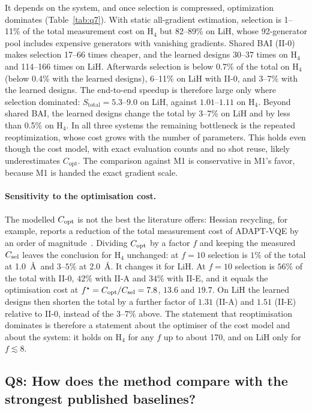 \documentclass[aps,pra,reprint,superscriptaddress,nofootinbib]{revtex4-2}
\begin{document}
It depends on the system, and once selection is compressed, optimization dominates (Table~\ref{tab:q7}). With static all-gradient estimation, selection is 1--11\% of the total measurement cost on H$_4$ but 82--89\% on LiH, whose 92-generator pool includes expensive generators with vanishing gradients. Shared BAI (II-0) makes selection 17--66 times cheaper, and the learned designs 30--37 times on H$_4$ and 114--166 times on LiH. Afterwards selection is below 0.7\% of the total on H$_4$ (below 0.4\% with the learned designs), 6--11\% on LiH with II-0, and 3--7\% with the learned designs. The end-to-end speedup is therefore large only where selection dominated: $S_{\mathrm{total}}=5.3$--$9.0$ on LiH, against $1.01$--$1.11$ on H$_4$. Beyond shared BAI, the learned designs change the total by 3--7\% on LiH and by less than 0.5\% on H$_4$. In all three systems the remaining bottleneck is the repeated reoptimization, whose cost grows with the number of parameters. This holds even though the cost model, with exact evaluation counts and no shot reuse, likely underestimates $C_{\mathrm{opt}}$. The comparison against M1 is conservative in M1's favor, because M1 is handed the exact gradient scale.

\paragraph{Sensitivity to the optimisation cost.} The modelled $C_{\rm opt}$ is not the best the literature offers: Hessian recycling, for example, reports a reduction of the total measurement cost of ADAPT-VQE by an order of magnitude~\cite{ramoa2025hessian}. Dividing $C_{\rm opt}$ by a factor $f$ and keeping the measured $C_{\rm sel}$ leaves the conclusion for H$_4$ unchanged: at $f=10$ selection is $1\%$ of the total at 1.0~\AA\ and $3$--$5\%$ at 2.0~\AA. It changes it for LiH. At $f=10$ selection is $56\%$ of the total with II-0, $42\%$ with II-A and $34\%$ with II-E, and it equals the optimisation cost at $f^\star=C_{\rm opt}/C_{\rm sel}=7.8$, $13.6$ and $19.7$. On LiH the learned designs then shorten the total by a further factor of $1.31$ (II-A) and $1.51$ (II-E) relative to II-0, instead of the $3$--$7\%$ above. The statement that reoptimisation dominates is therefore a statement about the optimiser of the cost model and about the system: it holds on H$_4$ for any $f$ up to about 170, and on LiH only for $f\lesssim8$.

\subsection{Q8: How does the method compare with the strongest published baselines?}
\label{sec:q8}
\end{document}
